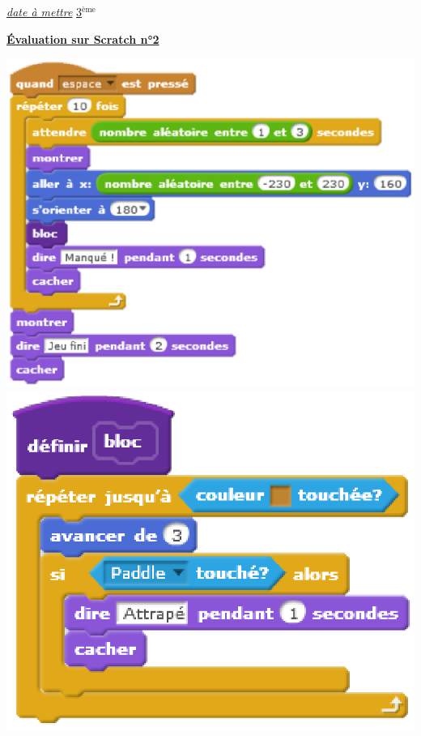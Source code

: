 \documentclass[12pt,a4paper]{article}
\newcommand{\ent}[4]{\begin{flushleft}
\underline{#1}
\hfill
\underline{#2$^{\text{ème}}$ #3}
\vspace{12 pt}
\end{flushleft}
\begin{center}
\begin{LARGE}
\textbf{\underline{\'Evaluation sur Scratch n°#4}}
\vspace{6 pt}
\end{LARGE}
\end{center}}
\begin{document}
\ent{\textit{date à mettre}}{3}{}{2}
\includegraphics[scale=0.5]{Evaluation2a_Script.eps} \hspace*{3cm}
\includegraphics[scale=0.5]{Evaluation2b_Script.eps} \vspace{3pt}
\end{document}

